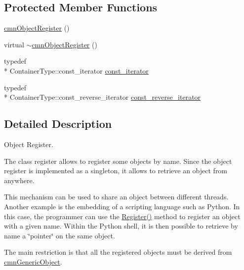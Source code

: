 \subsection*{Protected Member Functions}
\begin{DoxyCompactItemize}
\item 
\hyperlink{classcmn_object_register_a184065a86d3b7d16945c741774ddb1fd}{cmn\-Object\-Register} ()
\item 
virtual \hyperlink{classcmn_object_register_a62e20c711ded93c1163443d1cc0e6564}{$\sim$cmn\-Object\-Register} ()
\end{DoxyCompactItemize}
\begin{DoxyCompactItemize}
\item 
typedef \\*
Container\-Type\-::const\-\_\-iterator \hyperlink{classcmn_object_register_a660d73b1be5af069a8f09606a5819d2e}{const\-\_\-iterator}
\item 
typedef \\*
Container\-Type\-::const\-\_\-reverse\-\_\-iterator \hyperlink{classcmn_object_register_a950b9ecbe6287e932232dc5c172e5b1f}{const\-\_\-reverse\-\_\-iterator}
\end{DoxyCompactItemize}


\subsection{Detailed Description}
Object Register. 

The class register allows to register some objects by name. Since the object register is implemented as a singleton, it allows to retrieve an object from anywhere.

This mechanism can be used to share an object between different threads. Another example is the embedding of a scripting language such as Python. In this case, the programmer can use the \hyperlink{classcmn_object_register_a21c87771e997e5bca1a77133617abd00}{Register()} method to register an object with a given name. Within the Python shell, it is then possible to retrieve by name a \char`\"{}pointer\char`\"{} on the same object.

The main restriction is that all the registered objects must be derived from \hyperlink{classcmn_generic_object}{cmn\-Generic\-Object}. 

